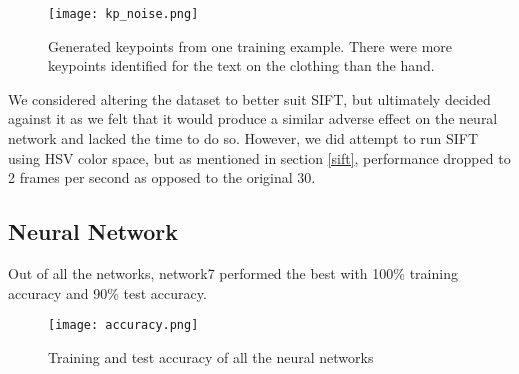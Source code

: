 \begin{figure}[h]
\texttt{[image: kp\_noise.png]}
\centering
\caption{Generated keypoints from one training example. There were more keypoints identified for the text on the clothing than the hand.}
\label{kp_noise}
\end{figure}

We considered altering the dataset to better suit SIFT, but ultimately decided against it as we felt that it would produce a similar adverse effect on the neural network and lacked the time to do so. However, we did attempt to run SIFT using HSV color space, but as mentioned in section \ref{sift}, performance dropped to 2 frames per second as opposed to the original 30.

\subsection{Neural Network}
\label{perf_NN}
Out of all the networks, network7 performed the best with 100\% training accuracy and 90\% test accuracy.

\begin{figure}[h]
\texttt{[image: accuracy.png]}
\centering
\caption{Training and test accuracy of all the neural networks}
\end{figure}